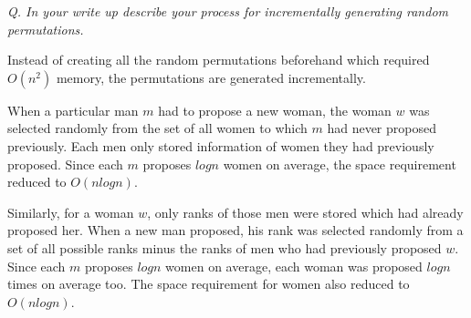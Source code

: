 \documentclass{homeworg}
\begin{document}
\emph{Q. In your write up describe your process for incrementally generating random permutations.}

Instead of creating all the random permutations beforehand which required $O(n^2)$ memory, the permutations are generated incrementally.

When a particular man $m$ had to propose a new woman, the woman $w$ was selected randomly from the set of all women to which $m$ had never proposed previously. Each men only stored information of women they had previously proposed. Since each $m$ proposes $log n$ women on average, the space requirement reduced to $O(n logn)$. 

Similarly, for a woman $w$, only ranks of those men were stored which had already proposed her. When a new man proposed, his rank was selected randomly from a set of all possible ranks minus the ranks of men who had previously proposed $w$.  Since each $m$ proposes $log n$ women on average, each woman was proposed $log n$ times on average too. The space requirement for women also reduced to $O(n logn)$. 
\end{document}
